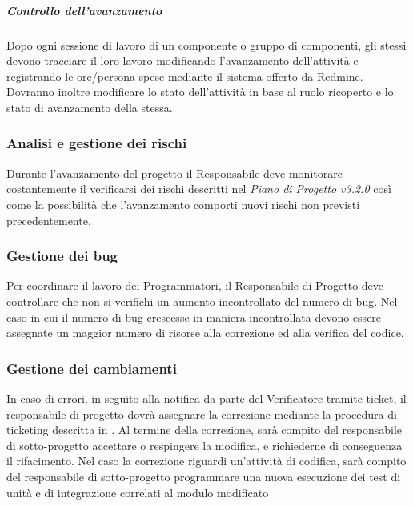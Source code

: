 \subparagraph{Controllo dell'avanzamento}
\label{}
Dopo ogni sessione di lavoro di un componente o gruppo di componenti, gli stessi devono tracciare il loro lavoro modificando l'avanzamento dell'attività e registrando le ore/persona spese mediante il sistema offerto da Redmine.
Dovranno inoltre modificare lo stato dell'attività in base al ruolo ricoperto e lo stato di avanzamento della stessa. 
%

\subsubsection{Analisi e gestione dei rischi}
\label{}
Durante l'avanzamento del progetto il Responsabile  deve monitorare costantemente il verificarsi dei rischi descritti nel \emph{Piano di Progetto v3.2.0} così come la possibilità che l'avanzamento comporti nuovi rischi non previsti precedentemente.

\subsubsection{Gestione dei bug}
Per coordinare il lavoro dei Programmatori, il Responsabile di Progetto deve controllare che non
si verifichi un aumento incontrollato del numero di bug. Nel caso in cui il numero di bug crescesse in maniera incontrollata
devono essere assegnate un maggior numero di risorse alla correzione ed alla verifica del codice.

\subsubsection{Gestione dei cambiamenti}

In caso di errori, in seguito alla notifica da parte del Verificatore tramite ticket, il
responsabile di progetto dovrà assegnare la correzione mediante la procedura di
ticketing descritta in 
. Al termine della correzione, sarà compito del responsabile
di sotto-progetto accettare o respingere la modifica, e richiederne di conseguenza il rifacimento.
Nel caso la correzione riguardi un’attività di codifica, sarà compito del responsabile di sotto-progetto programmare una nuova esecuzione dei test di unità e di integrazione correlati al modulo modificato


